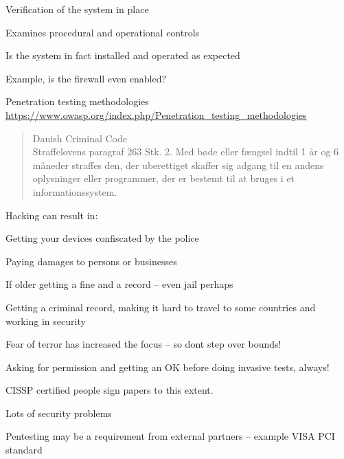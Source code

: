 \documentclass[Screen16to9,17pt]{foils}
\begin{document}


\begin{list1}
\item Verification of the system in place
\item Examines procedural and operational controls
\item Is the system in fact installed and operated as expected
\item Example, is the firewall even enabled?
\item Penetration testing methodologies\\
\url{https://www.owasp.org/index.php/Penetration_testing_methodologies}
\end{list1}




\begin{quote}\small
Danish Criminal Code\\
Straffelovens paragraf 263 Stk. 2. Med bøde eller fængsel indtil 1 år og 6 måneder straffes den, der uberettiget skaffer sig adgang til en andens oplysninger eller programmer, der er bestemt til at bruges i et informationssystem.
\end{quote}

Hacking can result in:
\begin{list2}
\item Getting your devices confiscated by the police
\item Paying damages to persons or businesses
\item If older getting a fine and a record -- even jail perhaps
\item Getting a criminal record, making it hard to travel to some countries and working in security
\item Fear of terror has increased the focus -- so dont step over bounds!
\end{list2}

Asking for permission and getting an OK before doing invasive tests, always!



CISSP certified people sign papers to this extent.\\



\begin{list1}
\item Lots of security problems
\item Pentesting may be a requirement from external partners -- example VISA PCI standard
\end{list1}
\end{document}
